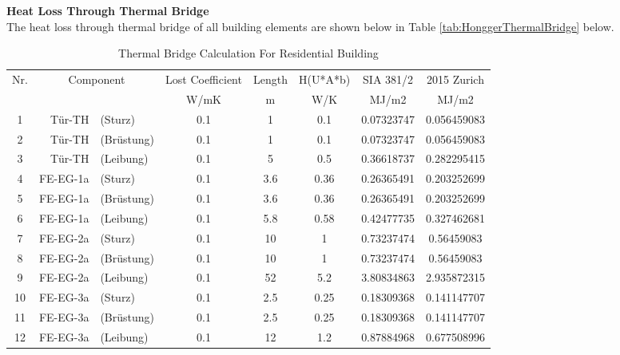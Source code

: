 \documentclass[11pt, a4paper]{article}
\theoremstyle{definition}
\begin{document}
		\textbf{Heat Loss Through Thermal Bridge}\\
		The heat loss through thermal bridge of all building elements are shown below in Table \ref{tab:HonggerThermalBridge} below.
		\begin{table}[H]
		\small
		\centering
		\caption{Thermal Bridge Calculation For Residential Building}
		    \begin{tabular}{ccrccccc}
		    \toprule
		    \multicolumn{1}{l}{Nr.} & \multicolumn{2}{c}{Component} & Lost Coefficient & Length & H(U*A*b) & SIA 381/2 & 2015 Zurich \\
		         &      &      & W/mK & m    & W/K  & MJ/m2 & MJ/m2 \\
		    \midrule
		    1    & \multicolumn{1}{r}{Tür-TH} & \multicolumn{1}{l}{(Sturz)} & 0.1  & 1    & 0.1  & 0.07323747 & 0.056459083 \\
		    2    & \multicolumn{1}{r}{Tür-TH} & \multicolumn{1}{l}{(Brüstung)} & 0.1  & 1    & 0.1  & 0.07323747 & 0.056459083 \\
		    3    & \multicolumn{1}{r}{Tür-TH} & \multicolumn{1}{l}{(Leibung)} & 0.1  & 5    & 0.5  & 0.36618737 & 0.282295415 \\
		    4    & \multicolumn{1}{r}{FE-EG-1a} & \multicolumn{1}{l}{(Sturz)} & 0.1  & 3.6  & 0.36 & 0.26365491 & 0.203252699 \\
		    5    & \multicolumn{1}{r}{FE-EG-1a} & \multicolumn{1}{l}{(Brüstung)} & 0.1  & 3.6  & 0.36 & 0.26365491 & 0.203252699 \\
		    6    & \multicolumn{1}{r}{FE-EG-1a} & \multicolumn{1}{l}{(Leibung)} & 0.1  & 5.8  & 0.58 & 0.42477735 & 0.327462681 \\
		    7    & \multicolumn{1}{r}{FE-EG-2a} & \multicolumn{1}{l}{(Sturz)} & 0.1  & 10   & 1    & 0.73237474 & 0.56459083 \\
		    8    & \multicolumn{1}{r}{FE-EG-2a} & \multicolumn{1}{l}{(Brüstung)} & 0.1  & 10   & 1    & 0.73237474 & 0.56459083 \\
		    9    & \multicolumn{1}{r}{FE-EG-2a} & \multicolumn{1}{l}{(Leibung)} & 0.1  & 52   & 5.2  & 3.80834863 & 2.935872315 \\
		    10   & \multicolumn{1}{r}{FE-EG-3a} & \multicolumn{1}{l}{(Sturz)} & 0.1  & 2.5  & 0.25 & 0.18309368 & 0.141147707 \\
		    11   & \multicolumn{1}{r}{FE-EG-3a} & \multicolumn{1}{l}{(Brüstung)} & 0.1  & 2.5  & 0.25 & 0.18309368 & 0.141147707 \\
		    12   & \multicolumn{1}{r}{FE-EG-3a} & \multicolumn{1}{l}{(Leibung)} & 0.1  & 12   & 1.2  & 0.87884968 & 0.677508996 \\

\end{tabular}
\end{table}
\end{document}
